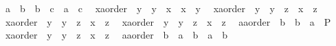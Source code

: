 \begin{isabellebody}
\ \ {\isachardoublequoteopen}a\ {\isasymge}\ b\ {\isasymLongrightarrow}\ b\ {\isacharequal}{\kern0pt}\ c\ {\isasymLongrightarrow}\ a\ {\isasymge}\ c{\isachardoublequoteclose}\isanewline
\ \ {\isachardoublequoteopen}{\isacharparenleft}{\kern0pt}x{\isacharcolon}{\kern0pt}{\isacharcolon}{\kern0pt}{\isacharprime}{\kern0pt}a{\isacharcolon}{\kern0pt}{\isacharcolon}{\kern0pt}order{\isacharparenright}{\kern0pt}\ {\isasymge}\ y\ {\isasymLongrightarrow}\ y\ {\isasymge}\ x\ {\isasymLongrightarrow}\ x\ {\isacharequal}{\kern0pt}\ y{\isachardoublequoteclose}\isanewline
\ \ {\isachardoublequoteopen}{\isacharparenleft}{\kern0pt}x{\isacharcolon}{\kern0pt}{\isacharcolon}{\kern0pt}{\isacharprime}{\kern0pt}a{\isacharcolon}{\kern0pt}{\isacharcolon}{\kern0pt}order{\isacharparenright}{\kern0pt}\ {\isasymge}\ y\ {\isasymLongrightarrow}\ y\ {\isasymge}\ z\ {\isasymLongrightarrow}\ x\ {\isasymge}\ z{\isachardoublequoteclose}\isanewline
\ \ {\isachardoublequoteopen}{\isacharparenleft}{\kern0pt}x{\isacharcolon}{\kern0pt}{\isacharcolon}{\kern0pt}{\isacharprime}{\kern0pt}a{\isacharcolon}{\kern0pt}{\isacharcolon}{\kern0pt}order{\isacharparenright}{\kern0pt}\ {\isachargreater}{\kern0pt}\ y\ {\isasymLongrightarrow}\ y\ {\isasymge}\ z\ {\isasymLongrightarrow}\ x\ {\isachargreater}{\kern0pt}\ z{\isachardoublequoteclose}\isanewline
\ \ {\isachardoublequoteopen}{\isacharparenleft}{\kern0pt}x{\isacharcolon}{\kern0pt}{\isacharcolon}{\kern0pt}{\isacharprime}{\kern0pt}a{\isacharcolon}{\kern0pt}{\isacharcolon}{\kern0pt}order{\isacharparenright}{\kern0pt}\ {\isasymge}\ y\ {\isasymLongrightarrow}\ y\ {\isachargreater}{\kern0pt}\ z\ {\isasymLongrightarrow}\ x\ {\isachargreater}{\kern0pt}\ z{\isachardoublequoteclose}\isanewline
\ \ {\isachardoublequoteopen}{\isacharparenleft}{\kern0pt}a{\isacharcolon}{\kern0pt}{\isacharcolon}{\kern0pt}{\isacharprime}{\kern0pt}a{\isacharcolon}{\kern0pt}{\isacharcolon}{\kern0pt}order{\isacharparenright}{\kern0pt}\ {\isachargreater}{\kern0pt}\ b\ {\isasymLongrightarrow}\ b\ {\isachargreater}{\kern0pt}\ a\ {\isasymLongrightarrow}\ P{\isachardoublequoteclose}\isanewline
\ \ {\isachardoublequoteopen}{\isacharparenleft}{\kern0pt}x{\isacharcolon}{\kern0pt}{\isacharcolon}{\kern0pt}{\isacharprime}{\kern0pt}a{\isacharcolon}{\kern0pt}{\isacharcolon}{\kern0pt}order{\isacharparenright}{\kern0pt}\ {\isachargreater}{\kern0pt}\ y\ {\isasymLongrightarrow}\ y\ {\isachargreater}{\kern0pt}\ z\ {\isasymLongrightarrow}\ x\ {\isachargreater}{\kern0pt}\ z{\isachardoublequoteclose}\isanewline
\ \ {\isachardoublequoteopen}{\isacharparenleft}{\kern0pt}a{\isacharcolon}{\kern0pt}{\isacharcolon}{\kern0pt}{\isacharprime}{\kern0pt}a{\isacharcolon}{\kern0pt}{\isacharcolon}{\kern0pt}order{\isacharparenright}{\kern0pt}\ {\isasymge}\ b\ {\isasymLongrightarrow}\ a\ {\isasymnoteq}\ b\ {\isasymLongrightarrow}\ a\ {\isachargreater}{\kern0pt}\ b{\isachardoublequoteclose}\isanewline

\end{isabellebody}
